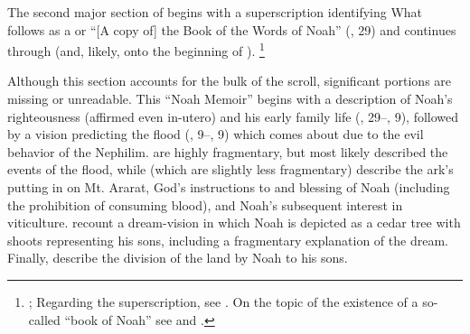 The second major section of \ga begins with a superscription identifying What follows as a  or ``[A copy of] the Book of the Words of Noah'' (, 29) and continues through  (and, likely, onto the beginning of ).%
%
\footnote{\cite[174--175]{nickelsburg2005}; Regarding the superscription, see \cite{steiner_dsd1995}. On the topic of the existence of a so-called ``book of Noah'' see \cite{dimant_vanderkam-etal2006} and \cite{werman_chazon-etal1999}.}

Although this section accounts for the bulk of the scroll, significant portions are missing or unreadable. This ``Noah Memoir'' begins with a description of Noah's righteousness\autocite{vanderkam_collins-nickelsburg1980} (affirmed even in-utero) and his early family life (, 29--, 9), followed by a vision predicting the flood (, 9--, 9) which comes about due to the evil behavior of the Nephilim.  are highly fragmentary, but most likely described the events of the flood, while  (which are slightly less fragmentary) describe the ark's putting in on Mt. Ararat, God's instructions to  and blessing of Noah (including the prohibition of consuming blood), and Noah's subsequent interest in viticulture.  recount a dream-vision in which Noah is depicted as a cedar tree with shoots representing his sons, including a fragmentary explanation of the dream. Finally,  describe the division of the land by Noah to his sons.

